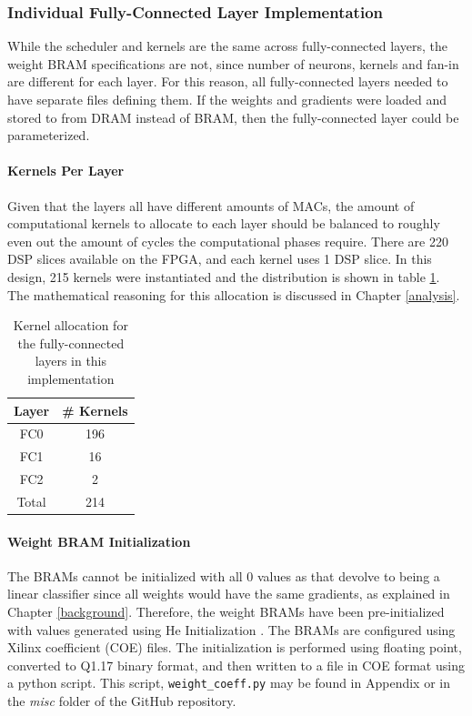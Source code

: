 \subsubsection{Individual Fully-Connected Layer Implementation}
While the scheduler and kernels are the same across fully-connected layers, the weight BRAM specifications are not, since number of neurons, kernels and fan-in are different for each layer. For this reason, all fully-connected layers needed to have separate files defining them. If the weights and gradients were loaded and stored to from DRAM instead of BRAM, then the fully-connected layer could be parameterized.

\paragraph{Kernels Per Layer}
Given that the layers all have different amounts of MACs, the amount of computational kernels to allocate to each layer should be balanced to roughly even out the amount of cycles the computational phases require. There are 220 DSP slices available on the FPGA, and each kernel uses 1 DSP slice. In this design, 215 kernels were instantiated and the distribution is shown in table \ref{dsp-alloc}. The mathematical reasoning for this allocation is discussed in Chapter \ref{analysis}.
\begin{table}
	\centering
	\begin{tabular}{| c | c |}
		\hline
		\textbf{Layer} & \textbf{\# Kernels} \\\hline
		FC0 & 196 \\\hline 
		FC1 & 16 \\\hline 
		FC2 & 2 \\\hline	
		Total & 214 \\\hline	
	\end{tabular}
	\caption{Kernel allocation for the fully-connected layers in this implementation}
	\label{dsp-alloc}
\end{table}

\paragraph{Weight BRAM Initialization}
The BRAMs cannot be initialized with all 0 values as that devolve to being a linear classifier since all weights would have the same gradients, as explained in Chapter \ref{background}. Therefore, the weight BRAMs have been pre-initialized with values generated using He Initialization \cite{HeZR015}. The BRAMs are configured using Xilinx coefficient (COE) files. The initialization is performed using floating point, converted to Q1.17 binary format, and then written to a file in COE format using a python script. This script, \texttt{weight\_coeff.py} may be found in Appendix  or in the \textit{misc} folder of the GitHub repository.

